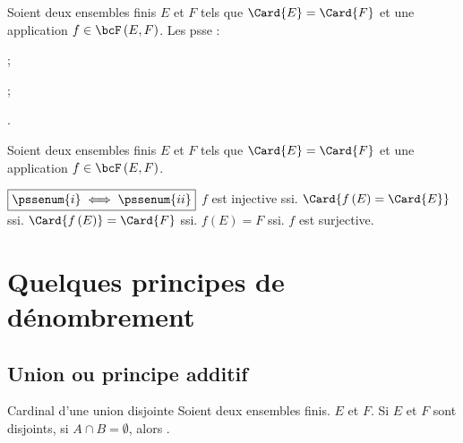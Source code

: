 \documentclass[a4paper,french,bookmarks]{article}
\begin{document}
\begin{theorem}{}{}
    Soient deux ensembles finis $E$ et $F$ tels que $\Card{E} = \Card{F}$ et une application $f \in \bcF\left(E, F\right)$. Les psse :
    \begin{psse}
        \item {} ;
        \item {} ;
        \item {}.
    \end{psse}
\end{theorem}

\begin{nproof}
    Soient deux ensembles finis $E$ et $F$ tels que $\Card{E} = \Card{F}$ et une application $f \in \bcF\left(E, F\right)$.
    
    \begin{enumerate}
        \itt $\boxed{\pssenum{i} \iff \pssenum{ii}}$ $f$ est injective ssi. $\Card{f\left(E\right) = \Card{E}}$ ssi. $\Card{f\left(E\right)} = \Card{F}$ ssi. $f\left(E\right) = F$ ssi. $f$ est surjective.
    \end{enumerate}
\end{nproof}

\section{Quelques principes de dénombrement}

\subsection{Union ou principe additif}

\begin{property}{Cardinal d'une union disjointe}{}
    Soient deux ensembles finis. $E$ et $F$. Si $E$ et $F$ sont disjoints, \ie si $A \cap B = \emptyset$, alors .
\end{property}
\end{document}
